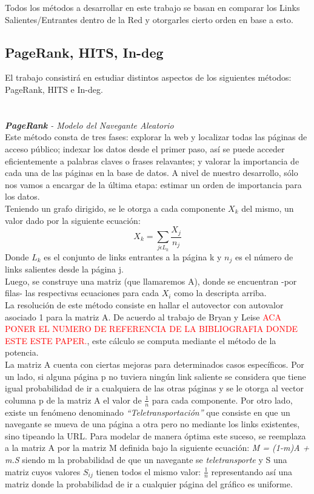 \documentclass[a4paper]{article}
\begin{document}
Todos los m\'etodos a desarrollar en este trabajo se basan en comparar los Links Salientes/Entrantes dentro de la Red y otorgarles cierto orden en base a esto.
\\
\subsection{PageRank, HITS, In-deg}
El trabajo consistir\'a en estudiar distintos aspectos de los siguientes m\'etodos: PageRank,
HITS e In-deg. \\
\\
\\
\indent \indent \emph{\textbf{PageRank} - Modelo del Navegante Aleatorio} \\
\indent Este m\'etodo consta de tres fases: explorar la web y localizar todas las p\'aginas de acceso p\'ublico; indexar los datos desde el primer paso, as\'i se puede acceder eficientemente a palabras claves o frases relavantes; y valorar la importancia de cada una de las p\'aginas en la base de datos. A nivel de nuestro desarrollo, s\'olo nos vamos a encargar de la \'ultima etapa: estimar un orden de importancia para los datos.\\
\indent Teniendo un grafo dirigido, se le otorga a cada componente $X_k$ del mismo, un valor dado por la siguiente ecuaci\'on:
\[
 X_k = \sum_{j \epsilon L_k} \frac{X_j}{n_j}
\]
Donde\emph{ $L_k$} es el conjunto de links entrantes a la p\'agina k y \emph{$n_j$} es el n\'umero de links salientes desde la p\'agina j.\\
\indent Luego, se construye una matriz (que llamaremos A), donde se encuentran -por filas- las respectivas ecuaciones para cada $X_i$ como la descripta arriba.\\
\indent La resoluci\'on de este m\'etodo consiste en hallar el autovector con autovalor asociado 1 para la matriz A. De acuerdo al trabajo de Bryan y Leise \textcolor{red}{ACA PONER EL NUMERO DE REFERENCIA DE LA BIBLIOGRAFIA DONDE ESTE ESTE PAPER.}, este c\'alculo se computa mediante el m\'etodo de la potencia. \\
\indent La matriz A cuenta con ciertas mejoras para determinados casos espec\'ificos. Por un lado, si alguna p\'agina p no tuviera ning\'un link saliente se considera que tiene igual probabilidad de ir a cualquiera de las otras p\'aginas y se le otorga al vector columna p de la matriz A el valor de $\frac{1}{n}$ para cada componente. Por otro lado, existe un fen\'omeno denominado \textit{``Teletransportaci\'on''} que consiste en que un navegante se mueva de una p\'agina a otra pero no mediante los links existentes, sino tipeando la URL. Para modelar de manera \'optima este suceso, se reemplaza a la matriz A por la matriz M definida bajo la siguiente ecuaci\'on: \textit{M = (1-m)A + m.S} siendo m la probabilidad de que un navegante se \textit{teletransporte} y S una matriz cuyos valores $S_{ij}$ tienen todos el mismo valor: $\frac{1}{n}$ representando as\'i una matriz donde la probabilidad de ir a cualquier p\'agina del gr\'afico es uniforme.\\
\end{document}
